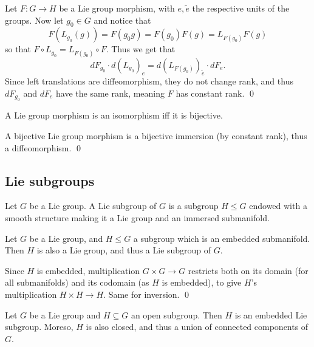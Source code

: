 \ethrm

\bproof

    Let $F\colon G\to H$ be a Lie group morphism, with $e,\tilde e$ the respective units of the groups.
    Now let $g_0\in G$ and notice that
    $$ F(L_{g_0}(g)) = F(g_0g) = F(g_0)F(g) = L_{F(g_0)}F(g) $$
    so that $F\circ L_{g_0}=L_{F(g_0)}\circ F$.
    Thus we get that
    $$ dF_{g_0}\cdot d(L_{g_0})_e = d(L_{F(g_0)})_{\tilde e}\cdot dF_e . $$
    Since left translations are diffeomorphism, they do not change rank, and thus $dF_{g_0}$ and $dF_e$ have the same rank, meaning
    $F$ has constant rank.
    \qed

\eproof

\bcoro

    A Lie group morphism is an isomorphism iff it is bijective.

\ecoro

\bproof

    A bijective Lie group morphism is a bijective immersion (by constant rank), thus a diffeomorphism.
    \qed

\eproof

\subsection{Lie subgroups}

\bdefn

    Let $G$ be a Lie group.
    A {\emphcolor Lie subgroup} of $G$ is a subgroup $H\leq G$ endowed with a smooth structure making it a Lie group and an immersed submanifold.

\edefn

\bprop

    Let $G$ be a Lie group, and $H\leq G$ a subgroup which is an embedded submanifold.
    Then $H$ is also a Lie group, and thus a Lie subgroup of $G$.

\eprop

\bproof

    Since $H$ is embedded, multiplication $G\times G\to G$ restricts both on its domain (for all submanifolds) and its codomain (as $H$ is embedded),
    to give $H$'s multiplication $H\times H\to H$.
    Same for inversion.
    \qed

\eproof

\blemm

    Let $G$ be a Lie group and $H\subseteq G$ an open subgroup.
    Then $H$ is an embedded Lie subgroup.
    Moreso, $H$ is also closed, and thus a union of connected components of $G$.


